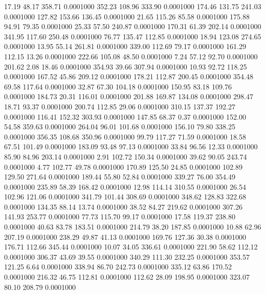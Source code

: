   17.19   48.17  358.71   0.0001000
 352.23  108.96  333.90   0.0001000
 174.46  131.75  241.03   0.0001000
 127.82  153.66  136.45   0.0001000
  21.65  115.26   85.58   0.0001000
 175.88   94.91   79.35   0.0001000
  25.33   57.50  240.87   0.0001000
 170.31   61.39  202.14   0.0001000
 341.95  117.60  250.48   0.0001000
  76.77  135.47  112.85   0.0001000
  18.94  123.08  274.65   0.0001000
  13.95   55.14  261.81   0.0001000
 339.00  112.69   79.17   0.0001000
 161.29  112.15   13.26   0.0001000
 222.66  105.08   48.50   0.0001000
   7.24   57.12   92.70   0.0001000
 201.62    2.08   18.46   0.0001000
 354.93   39.66  307.94   0.0001000
  10.93   92.72  118.25   0.0001000
 167.52   45.86  209.12   0.0001000
 178.21  112.87  200.45   0.0001000
 354.48   69.58  117.64   0.0001000
  32.87   67.30  104.18   0.0001000
 150.95   83.18  109.76   0.0001000
 184.73   20.31  116.01   0.0001000
 201.88  169.87  134.08   0.0001000
 298.47   18.71   93.37   0.0001000
 200.74  112.85   29.06   0.0001000
 310.15  137.37  192.27   0.0001000
 116.41  152.32  303.93   0.0001000
 147.85   68.37    0.37   0.0001000
 152.00   54.58  359.63   0.0001000
 264.04   96.01  101.68   0.0001000
 156.10   79.80  338.25   0.0001000
 356.35  108.68  350.96   0.0001000
  99.79  117.27   71.59   0.0001000
  18.58   67.51  101.49   0.0001000
 183.09   93.48   97.13   0.0001000
  33.84   96.56   12.33   0.0001000
  85.90   84.96  203.14   0.0001000
   2.91  102.72  150.34   0.0001000
  39.62   90.05  243.74   0.0001000
   4.77  102.77   49.78   0.0001000
 170.89  125.50   24.85   0.0001000
 102.89  129.50  271.64   0.0001000
 189.44   55.80   52.84   0.0001000
 339.27   76.00  354.49   0.0001000
 235.89   58.39  168.42   0.0001000
  12.98  114.14  310.55   0.0001000
  26.54  102.96  121.06   0.0001000
 341.79  101.44  308.69   0.0001000
 348.62  128.83  322.68   0.0001000
 134.35   88.14   13.74   0.0001000
  38.52   84.27  219.62   0.0001000
 307.26  141.93  253.77   0.0001000
  77.73  115.70   99.17   0.0001000
  17.58  119.37  238.80   0.0001000
  40.63   83.78  183.51   0.0001000
 214.79   38.20  187.85   0.0001000
  10.88   62.96  207.19   0.0001000
 238.29   49.87   41.13   0.0001000
 169.76  127.36   30.38   0.0001000
 176.71  112.66  345.44   0.0001000
  10.07   34.05  336.61   0.0001000
 221.90   58.62  112.12   0.0001000
 306.37   43.69   39.55   0.0001000
 340.29  111.30  232.25   0.0001000
 353.57  121.25    6.64   0.0001000
 338.94   86.70  242.73   0.0001000
 335.12   63.86  170.52   0.0001000
 216.32   46.75  112.81   0.0001000
 112.62   28.09  198.95   0.0001000
 323.07   80.10  208.79   0.0001000
